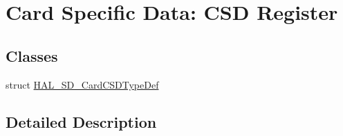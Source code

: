 \hypertarget{group___s_d___exported___types___group4}{}\section{Card Specific Data\+: C\+SD Register}
\label{group___s_d___exported___types___group4}
\subsection*{Classes}
\begin{DoxyCompactItemize}
\item 
struct \mbox{\hyperlink{struct_h_a_l___s_d___card_c_s_d_type_def}{H\+A\+L\+\_\+\+S\+D\+\_\+\+Card\+C\+S\+D\+Type\+Def}}
\end{DoxyCompactItemize}


\subsection{Detailed Description}
